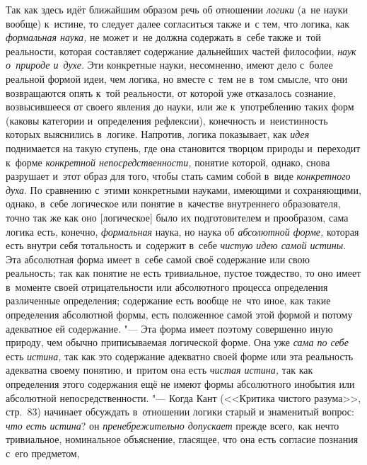 Так как здесь идёт ближайшим образом речь об отношении
{\em логики} (а~не науки
вообще) к~истине, то следует далее согласиться также и~с тем, что логика,
как {\em формальная наука,}
не может и~не должна содержать в~себе также и~той реальности,
которая составляет содержание дальнейших частей философии,
{\em наук о~природе и~духе}.
Эти конкретные науки, несомненно, имеют дело с~более реальной
формой идеи, чем логика, но вместе с~тем не в~том смысле, что они
возвращаются опять к~той реальности, от которой уже отказалось сознание,
возвысившееся от своего явления до науки, или же к~употреблению таких форм
(каковы категории и~определения рефлексии), конечность и~неистинность
которых выяснились в~логике. Напротив, логика показывает, как
{\em идея} поднимается на
такую ступень, где она становится творцом природы и~переходит к~форме
{\em конкретной непосредственности,}
понятие которой, однако, снова разрушает и~этот образ для
того, чтобы стать самим собой в~виде
{\em конкретного духа}.
По сравнению с~этими конкретными науками, имеющими и
сохраняющими, однако, в~себе логическое или понятие в~качестве внутреннего
образователя, точно так же как оно [логическое] было их подготовителем и
прообразом, сама логика есть, конечно,
{\em формальная} наука,
но наука об {\em абсолютной форме,}
которая есть внутри себя тотальность и~содержит в~себе
{\em чистую идею самой истины}.
Эта абсолютная форма имеет в~себе самой своё содержание или
свою реальность; так как понятие не есть тривиальное, пустое тождество, то
оно имеет в~моменте своей отрицательности или абсолютного процесса
определения различенные определения; содержание есть вообще не~что иное,
как такие определения абсолютной формы, есть положенное самой этой формой и
потому адекватное ей содержание. "--- Эта форма имеет поэтому
совершенно иную природу, чем обычно приписываемая логической
форме. Она уже {\em сама по себе}
есть {\em истина,}
так как это содержание адекватно своей форме или эта
реальность адекватна своему понятию, и~притом она есть
{\em чистая истина,} так
как определения этого содержания ещё не имеют формы абсолютного инобытия
или абсолютной непосредственности. "--- Когда Кант (<<Критика
чистого разума>>, стр.~83) начинает обсуждать в~отношении логики старый и
знаменитый вопрос: {\em что есть
истина}? он
{\em пренебрежительно допускает}
прежде всего, как нечто тривиальное, номинальное
объяснение, гласящее, что она есть согласие познания с~его
предметом,
